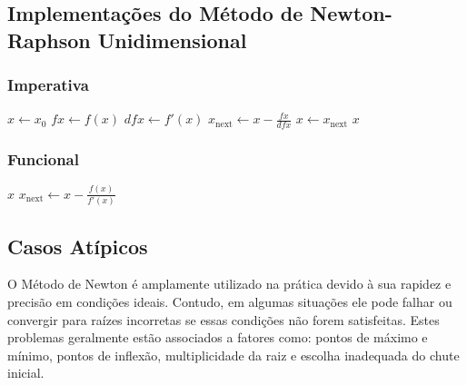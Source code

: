 \subsection{Implementações do Método de Newton-Raphson Unidimensional}

\subsubsection{Imperativa}

\begin{algorithm}[H]
    \caption{Newton-Raphson Iterativo}
    \label{alg:newton_imperativo}
    \begin{algorithmic}[1]
        \State $x \gets x_0$ 
        \State $fx \gets f(x)$
        \State $dfx \gets f'(x)$
        \State $x_{\text{next}} \gets x - \frac{fx}{dfx}$
        \State $x \gets x_{\text{next}}$ 
        \EndFor
        \State \Return $x$
        \EndProcedure
    \end{algorithmic}
\end{algorithm}

\subsubsection{Funcional}

\begin{algorithm}[H]
    \caption{Newton-Raphson Recursivo}
    \label{alg:newton_funcional}
    \begin{algorithmic}[1]

         
        \State \Return $x$ 
        \Else
        \State $x_{\text{next}} \gets x - \frac{f(x)}{f'(x)}$
        \State \Return {} 
        \EndIf
        \EndFunction

        \State \Return {} 
        \EndProcedure
    \end{algorithmic}
\end{algorithm}

\subsection{Casos Atípicos}
O Método de Newton é amplamente utilizado na prática devido à sua rapidez e
precisão em condições ideais. Contudo, em algumas situações ele pode falhar ou
convergir para raízes incorretas se essas condições não forem satisfeitas.
Estes problemas geralmente estão associados a fatores como: pontos de máximo e
mínimo, pontos de inflexão, multiplicidade da raiz e escolha inadequada do
chute inicial.

